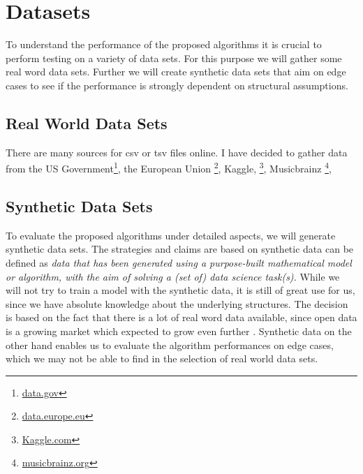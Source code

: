 \chapter{Datasets}
To understand the performance of the proposed algorithms it is crucial to perform testing on a variety of data sets. For this purpose we will gather some real word data sets. Further we will create synthetic data sets that aim on edge cases to see if the performance is strongly dependent on structural assumptions.

\section{Real World Data Sets}
There are many sources for csv or tsv files online. I have decided to gather data from the US Government\footnote{\href{https://data.gov}{data.gov}}, the European Union \footnote{\href{https://data.europe.eu}{data.europe.eu}}, Kaggle, \footnote{\href{https://kaggle.com}{Kaggle.com}}, Musicbrainz \footnote{\href{https://musicbrainz.org/}{musicbrainz.org}}, 


\section{Synthetic Data Sets}
To evaluate the proposed algorithms under detailed aspects, we will generate synthetic data sets. The strategies and claims are based on \cite{jordon2022synthetic} synthetic data can be defined as \textit{data that has been generated using a purpose-built mathematical model or algorithm, with the aim of solving a (set of) data science task(s).} While we will not try to train a model with the synthetic data, it is still of great use for us, since we have absolute knowledge about the underlying structures. The decision is based on the fact that there is a lot of real word data available, since open data is a growing market which expected to grow even further \cite{EUopenData}. Synthetic data on the other hand enables us to evaluate the algorithm performances on edge cases, which we may not be able to find in the selection of real world data sets. \\

